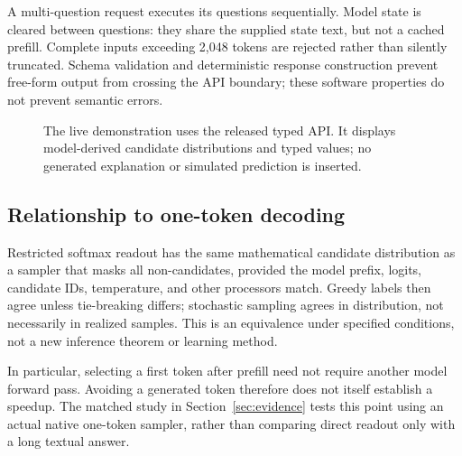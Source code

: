 \documentclass[11pt]{article}
\begin{document}
A multi-question request executes its questions sequentially. Model state is cleared between questions: they share the supplied state text, but not a cached prefill. Complete inputs exceeding 2,048 tokens are rejected rather than silently truncated. Schema validation and deterministic response construction prevent free-form output from crossing the API boundary; these software properties do not prevent semantic errors.

\begin{figure}[t]
\centering
{}
\caption{The live demonstration uses the released typed API. It displays model-derived candidate distributions and typed values; no generated explanation or simulated prediction is inserted.}
\label{fig:architecture}
\end{figure}

\subsection{Relationship to one-token decoding}
Restricted softmax readout has the same mathematical candidate distribution as a sampler that masks all non-candidates, provided the model prefix, logits, candidate IDs, temperature, and other processors match. Greedy labels then agree unless tie-breaking differs; stochastic sampling agrees in distribution, not necessarily in realized samples. This is an equivalence under specified conditions, not a new inference theorem or learning method.

In particular, selecting a first token after prefill need not require another model forward pass. Avoiding a generated token therefore does not itself establish a speedup. The matched study in Section~\ref{sec:evidence} tests this point using an actual native one-token sampler, rather than comparing direct readout only with a long textual answer.
\end{document}
